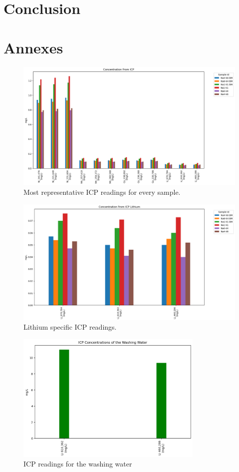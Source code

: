 \documentclass{article}
\begin{document}
\section{Conclusion}




\section{Annexes} 
\begin{figure}[H]
  \centering
  \includegraphics[width=\textwidth]{output.png}
  \caption{Most representative ICP readings for every sample.}
  \label{fig:example_image}
\end{figure}
\begin{figure}[H]
  \centering
  \includegraphics[width=\textwidth]{output3.png}
  \caption{Lithium specific ICP readings.}
  \label{fig:example_image}
\end{figure}
\begin{figure}[H]
  \centering
  \includegraphics[width=0.8\textwidth]{output2.png}
  \caption{ICP readings for the washing water }
  \label{fig:example_image}
\end{figure}
\newpage
\listoffigures

\listoftables



\end{document}
